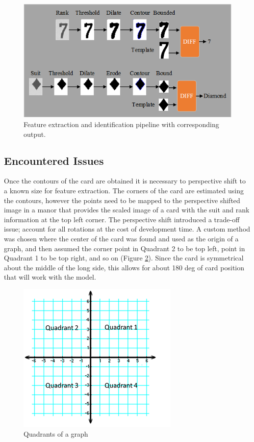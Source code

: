\documentclass[conference]{IEEEtran}
\begin{document}
\begin{figure}[htbp]
\centerline{\includegraphics[width=\columnwidth]{PipelineExecFlowchart.png}}
\caption{Feature extraction and identification pipeline with corresponding output.}
\label{fig:feature-extraction-pipeline}
\end{figure}

\subsection{Encountered Issues}
Once the contours of the card are obtained it is necessary to perspective shift to a known size for
feature extraction. The corners of the card are estimated using the contours, however the points
need to be mapped to the perspective shifted image in a manor that provides the scaled image of a
card with the suit and rank information at the top left corner. The perspective shift introduced a
trade-off issue; account for all rotations at the cost of development time. A custom method was
chosen where the center of the card was found and used as the origin of a graph, and then assumed
the corner point in Quadrant 2 to be top left, point in Quadrant 1 to be top right, and so on
(Figure \ref{fig:graph}). Since the card is symmetrical about the middle of the long side, this
allows for about 180 deg of card position that will work with the model.

\begin{figure}[htbp]
\centerline{\includegraphics{graph-quadrants.png}}
\caption{Quadrants of a graph}
\label{fig:graph}
\end{figure}
\end{document}
